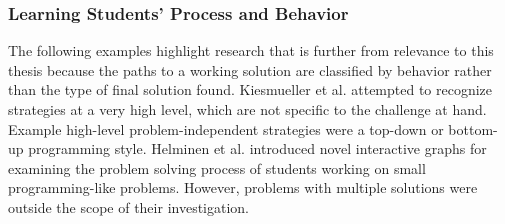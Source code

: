 \subsubsection{Learning Students' Process and Behavior}

The following examples highlight research that is further from relevance to this thesis because the paths to a working solution are classified by behavior rather than the type of final solution found. Kiesmueller et al. \cite{Kiesmueller} attempted to recognize strategies at a very high level, which are not specific to the challenge at hand. Example high-level problem-independent strategies were a top-down or bottom-up programming style. Helminen et al. \cite{ICERHelminen} introduced novel interactive graphs for examining the problem solving process of students working on small programming-like problems. However, problems with multiple solutions were outside the scope of their investigation.



%
%





%
%
%


